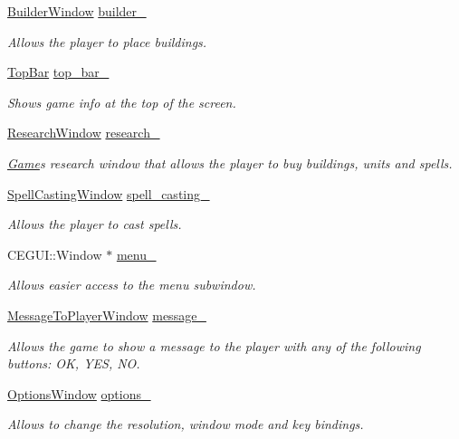 \begin{DoxyCompactItemize}
\hyperlink{class_builder_window}{Builder\+Window} \hyperlink{class_g_u_i_a0384e5c8eeb11e4181ca31e621a897cb}{builder\+\_\+}
\begin{DoxyCompactList}\small\item\em Allows the player to place buildings. \end{DoxyCompactList}\item 
\hyperlink{class_top_bar}{Top\+Bar} \hyperlink{class_g_u_i_a6de1adcb5f3b762f3f99e7b37db61740}{top\+\_\+bar\+\_\+}
\begin{DoxyCompactList}\small\item\em Shows game info at the top of the screen. \end{DoxyCompactList}\item 
\hyperlink{class_research_window}{Research\+Window} \hyperlink{class_g_u_i_a37611f1e119a7c0b0d8d9682ac8a9432}{research\+\_\+}
\begin{DoxyCompactList}\small\item\em \hyperlink{class_game}{Game}\textquotesingle{}s research window that allows the player to buy buildings, units and spells. \end{DoxyCompactList}\item 
\hyperlink{class_spell_casting_window}{Spell\+Casting\+Window} \hyperlink{class_g_u_i_a434c351b8b781d7bf19dfbae30bc7d73}{spell\+\_\+casting\+\_\+}
\begin{DoxyCompactList}\small\item\em Allows the player to cast spells. \end{DoxyCompactList}\item 
C\+E\+G\+U\+I\+::\+Window $\ast$ \hyperlink{class_g_u_i_aa9a52eb5090edfa1e62773be5dd03da3}{menu\+\_\+}
\begin{DoxyCompactList}\small\item\em Allows easier access to the menu subwindow. \end{DoxyCompactList}\item 
\hyperlink{class_message_to_player_window}{Message\+To\+Player\+Window} \hyperlink{class_g_u_i_a447ea4f3f0b635717a3a88317f534825}{message\+\_\+}
\begin{DoxyCompactList}\small\item\em Allows the game to show a message to the player with any of the following buttons\+: OK, Y\+ES, NO. \end{DoxyCompactList}\item 
\hyperlink{class_options_window}{Options\+Window} \hyperlink{class_g_u_i_ac08ccbb1a55bae003d956ff299db3d91}{options\+\_\+}
\begin{DoxyCompactList}\small\item\em Allows to change the resolution, window mode and key bindings. \end{DoxyCompactList}\end{DoxyCompactItemize}
